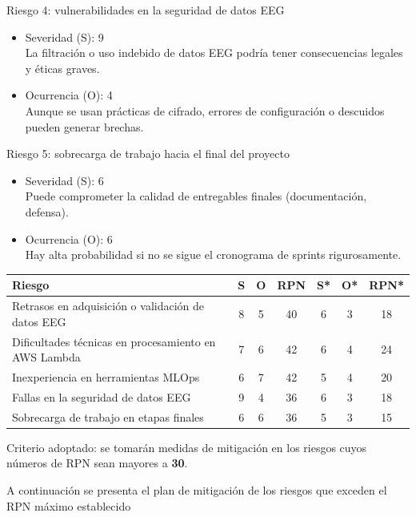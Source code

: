 \documentclass[
11pt, %
]{charter}
\begin{document}
Riesgo 4: vulnerabilidades en la seguridad de datos EEG
\begin{itemize}
    \item Severidad (S): 9 \\
    La filtración o uso indebido de datos EEG podría tener consecuencias legales y éticas graves.
    \item Ocurrencia (O): 4 \\
    Aunque se usan prácticas de cifrado, errores de configuración o descuidos pueden generar brechas.
\end{itemize}

Riesgo 5: sobrecarga de trabajo hacia el final del proyecto
\begin{itemize}
    \item Severidad (S): 6 \\
    Puede comprometer la calidad de entregables finales (documentación, defensa).
    \item Ocurrencia (O): 6 \\
    Hay alta probabilidad si no se sigue el cronograma de sprints rigurosamente.
\end{itemize}

\begin{table}[htpb]
\centering
\begin{tabularx}{\linewidth}{@{}|X|c|c|c|c|c|c|@{}}
\hline
\rowcolor[HTML]{C0C0C0}
\textbf{Riesgo} & \textbf{S} & \textbf{O} & \textbf{RPN} & \textbf{S*} & \textbf{O*} & \textbf{RPN*} \\ \hline
Retrasos en adquisición o validación de datos EEG & 8 & 5 & 40 & 6 & 3 & 18 \\ \hline
Dificultades técnicas en procesamiento en AWS Lambda & 7 & 6 & 42 & 6 & 4 & 24 \\ \hline
Inexperiencia en herramientas MLOps & 6 & 7 & 42 & 5 & 4 & 20 \\ \hline
Fallas en la seguridad de datos EEG & 9 & 4 & 36 & 6 & 3 & 18 \\ \hline
Sobrecarga de trabajo en etapas finales & 6 & 6 & 36 & 5 & 3 & 15 \\ \hline
\end{tabularx}


\end{table}
Criterio adoptado: se tomarán medidas de mitigación en los riesgos cuyos números de RPN sean mayores a \textbf{30}.

A continuación se presenta el plan de mitigación de los riesgos que exceden el RPN máximo establecido
\end{document}
